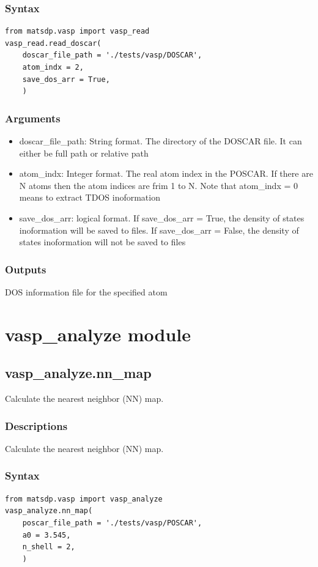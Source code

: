 \documentclass[12pt]{book}
\begin{document}
\subsubsection{Syntax}
\begin{lstlisting}
from matsdp.vasp import vasp_read
vasp_read.read_doscar(
    doscar_file_path = './tests/vasp/DOSCAR',
    atom_indx = 2,
    save_dos_arr = True,
    )
\end{lstlisting}
\subsubsection{Arguments}
\begin{itemize}
\item doscar\_file\_path: String format. The directory of the DOSCAR file. It can either be full path or relative path
\item atom\_indx: Integer format. The real atom index in the POSCAR. If there are N atoms then the atom indices are frim 1 to N. Note that atom\_indx = 0 means to extract TDOS inoformation
\item save\_dos\_arr: logical format. If save\_dos\_arr = True, the density of states inoformation will be saved to files. If save\_dos\_arr = False, the density of states inoformation will not be saved to files
\end{itemize}
\subsubsection{Outputs}
DOS information file for the specified atom

\section{vasp\_analyze module}
\subsection{vasp\_analyze.nn\_map}
Calculate the nearest neighbor (NN) map.

\subsubsection{Descriptions}
Calculate the nearest neighbor (NN) map.
\subsubsection{Syntax}
\begin{lstlisting}
from matsdp.vasp import vasp_analyze
vasp_analyze.nn_map(
    poscar_file_path = './tests/vasp/POSCAR',
    a0 = 3.545,
    n_shell = 2,
    )
\end{lstlisting}
\end{document}
